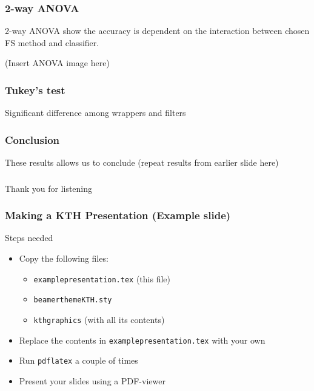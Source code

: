 \documentclass[aspectratio=1610]{beamer}
\begin{document}
\begin{frame}
  \frametitle{\hfill 2-way ANOVA}

  2-way ANOVA show the accuracy is dependent on the interaction between chosen FS method and classifier.

  (Insert ANOVA image here)
\end{frame}

\begin{frame}
  \frametitle{\hfill Tukey's test}
  Significant difference among wrappers and filters
\end{frame}

\begin{frame}
  \frametitle{\hfill Conclusion}
  These results allows us to conclude (repeat results from earlier slide here)
\end{frame}

\begin{frame}
  \frametitle{\hfill }
  Thank you for listening
\end{frame}




\begin{frame}
  \frametitle{\hfill Making a KTH Presentation (Example slide)}

  \begin{block}{Steps needed}
    \begin{itemize}
    \item Copy the following files:
    \begin{itemize}
    \item \texttt{examplepresentation.tex} (this file)
    \item \texttt{beamerthemeKTH.sty}
    \item \texttt{kthgraphics} (with all its contents)
    \end{itemize}
    \item Replace the contents in \texttt{examplepresentation.tex} with your own
    \item Run \texttt{pdflatex} a couple of times
    \item Present your slides using a PDF-viewer
    \end{itemize}
  \end{block}

\end{frame}
\end{document}
